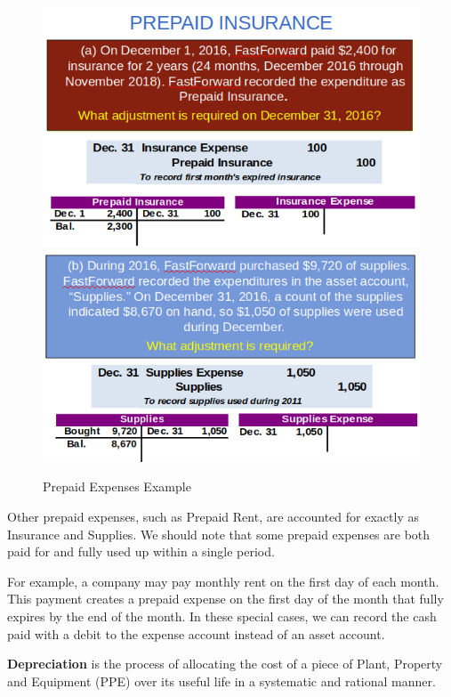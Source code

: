 \documentclass[../main.tex]{subfiles}
\begin{document}
	\begin{figure}[ht!]
		\centering
		\includegraphics[width=1\columnwidth]{images/c3/prepaid_insurance_eg.png}
		\includegraphics[width=1\columnwidth]{images/c3/supplies_eg.png}
		\caption{Prepaid Expenses Example}	
	\end{figure}
	
	Other prepaid expenses, such as Prepaid Rent, are accounted for exactly as 
	Insurance and Supplies. We should note that some prepaid expenses are both 
	paid for and fully used up within a single period. 
	
	For example, a company 
	may pay monthly rent on the first day of each month. This payment creates a 
	prepaid expense on the first day of the month that fully expires by the end 
	of the month. In these special cases, we can record the cash paid with a 
	debit to the expense account instead of an asset account.
	
	\textbf{Depreciation} is the process of allocating the cost of a piece of 
	Plant, Property and Equipment (PPE) over 
	its useful life in a systematic and rational manner.
	
\end{document}
